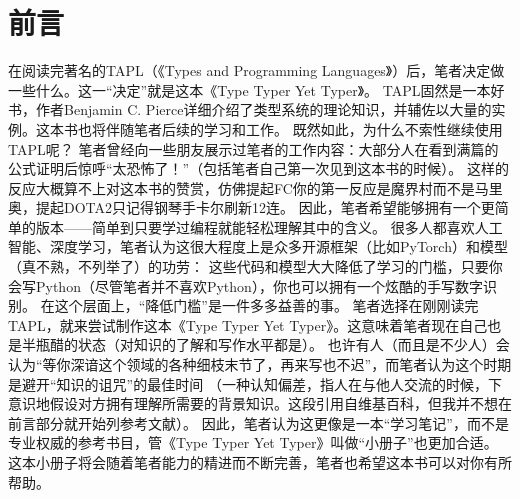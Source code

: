 \documentclass[../main.tex]{subfiles}
\begin{document}
  \section*{前言}
  \indent 在阅读完著名的TAPL（《Types and Programming Languages》）后，笔者决定做一些什么。这一“决定”就是这本《Type Typer Yet Typer》。
  \newline
  \indent TAPL固然是一本好书，作者Benjamin C. Pierce详细介绍了类型系统的理论知识，并辅佐以大量的实例。这本书也将伴随笔者后续的学习和工作。
  既然如此，为什么不索性继续使用TAPL呢？
  笔者曾经向一些朋友展示过笔者的工作内容：大部分人在看到满篇的公式证明后惊呼“太恐怖了！”（包括笔者自己第一次见到这本书的时候）。
  这样的反应大概算不上对这本书的赞赏，仿佛提起FC你的第一反应是魔界村而不是马里奥，提起DOTA2只记得钢琴手卡尔刷新12连。
  \newline
  \indent 因此，笔者希望能够拥有一个更简单的版本——简单到只要学过编程就能轻松理解其中的含义。
  很多人都喜欢人工智能、深度学习，笔者认为这很大程度上是众多开源框架（比如PyTorch）和模型（真不熟，不列举了）的功劳：
  这些代码和模型大大降低了学习的门槛，只要你会写Python（尽管笔者并不喜欢Python），你也可以拥有一个炫酷的手写数字识别。
  在这个层面上，“降低门槛”是一件多多益善的事。
  \newline
  \indent 笔者选择在刚刚读完TAPL，就来尝试制作这本《Type Typer Yet Typer》。这意味着笔者现在自己也是半瓶醋的状态（对知识的了解和写作水平都是）。
  也许有人（而且是不少人）会认为“等你深谙这个领域的各种细枝末节了，再来写也不迟”，而笔者认为这个时期是避开“知识的诅咒”的最佳时间
  （一种认知偏差，指人在与他人交流的时候，下意识地假设对方拥有理解所需要的背景知识。这段引用自维基百科，但我并不想在前言部分就开始列参考文献）。
  因此，笔者认为这更像是一本“学习笔记”，而不是专业权威的参考书目，管《Type Typer Yet Typer》叫做“小册子”也更加合适。
  这本小册子将会随着笔者能力的精进而不断完善，笔者也希望这本书可以对你有所帮助。
\end{document}
